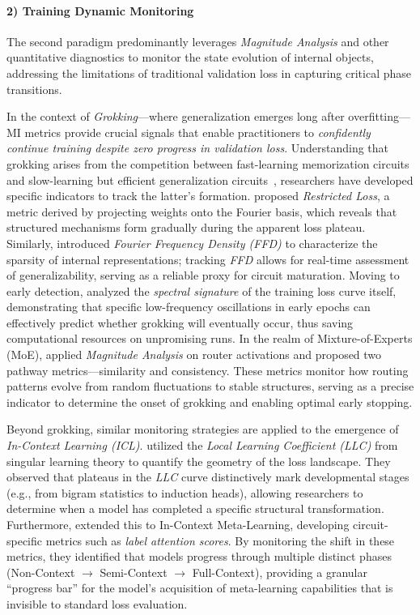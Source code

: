 \documentclass[11pt,letterpaper]{mystyle}
\begin{document}
  \paragraph{2) Training Dynamic Monitoring} 
  The second paradigm predominantly leverages \textit{Magnitude Analysis} and other quantitative diagnostics to monitor the state evolution of internal objects, addressing the limitations of traditional validation loss in capturing critical phase transitions.
  
  In the context of \textit{Grokking}---where generalization emerges long after overfitting---MI metrics provide crucial signals that enable practitioners to \textit{confidently continue training despite zero progress in validation loss}. 
  Understanding that grokking arises from the competition between fast-learning memorization circuits and slow-learning but efficient generalization circuits~\citep{varma2023explaining,huang2024unified}, researchers have developed specific indicators to track the latter's formation. 
  \citet{nandaprogress} proposed \textit{Restricted Loss}, a metric derived by projecting weights onto the Fourier basis, which reveals that structured mechanisms form gradually during the apparent loss plateau. 
  Similarly, \citet{furutatowards} introduced \textit{Fourier Frequency Density (FFD)} to characterize the sparsity of internal representations; tracking \textit{FFD} allows for real-time assessment of generalizability, serving as a reliable proxy for circuit maturation. 
  Moving to early detection, \citet{notsawo2023predicting} analyzed the \textit{spectral signature} of the training loss curve itself, demonstrating that specific low-frequency oscillations in early epochs can effectively predict whether grokking will eventually occur, thus saving computational resources on unpromising runs. 
  In the realm of Mixture-of-Experts (MoE), \citet{li2025find} applied \textit{Magnitude Analysis} on router activations and proposed two pathway metrics---similarity and consistency. These metrics monitor how routing patterns evolve from random fluctuations to stable structures, serving as a precise indicator to determine the onset of grokking and enabling optimal early stopping.
  
  Beyond grokking, similar monitoring strategies are applied to the emergence of \textit{In-Context Learning (ICL)}. 
  \citet{hoogland2402developmental} utilized the \textit{Local Learning Coefficient (LLC)} from singular learning theory to quantify the geometry of the loss landscape. They observed that plateaus in the \textit{LLC} curve distinctively mark developmental stages (e.g., from bigram statistics to induction heads), allowing researchers to determine when a model has completed a specific structural transformation.
  Furthermore, \citet{minegishi2025context} extended this to In-Context Meta-Learning, developing circuit-specific metrics such as \textit{label attention scores}. By monitoring the shift in these metrics, they identified that models progress through multiple distinct phases (Non-Context $\to$ Semi-Context $\to$ Full-Context), providing a granular ``progress bar'' for the model's acquisition of meta-learning capabilities that is invisible to standard loss evaluation.
\end{document}
